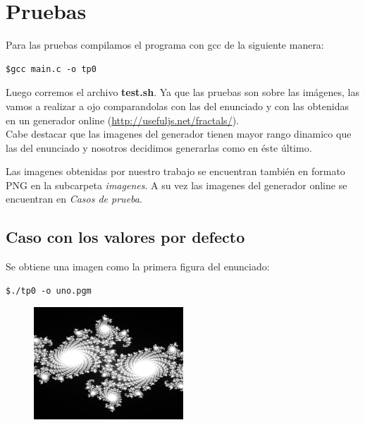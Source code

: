 \documentclass[a4paper,10pt]{article}
\begin{document}


\newpage

\section{Pruebas}

Para las pruebas compilamos el programa con gcc de la siguiente manera:

\begin{lstlisting}[frame=single]
$gcc main.c -o tp0
\end{lstlisting}
Luego corremos el archivo \textbf{test.sh}.
Ya que las pruebas son sobre las imágenes, las vamos a realizar a ojo comparandolas con las del enunciado y con las obtenidas en un generador online (\url{http://usefuljs.net/fractals/}).\\

Cabe destacar que las imagenes del generador tienen mayor rango dinamico que las del enunciado y nosotros decidimos generarlas como en \'{e}ste \'{u}ltimo.

Las imagenes obtenidas por nuestro trabajo se encuentran tambi\'{e}n en formato PNG en la subcarpeta \textit{imagenes}.
A su vez las imagenes del generador online se encuentran en \textit{Casos de prueba}.

\subsection{Caso con los valores por defecto}
Se obtiene una imagen como la primera figura del enunciado:

\begin{lstlisting}[frame=single]
$./tp0 -o uno.pgm
\end{lstlisting}

\begin{figure}[H]
\begin{center}
\includegraphics[width=0.5\textwidth]{imagenes/uno.png}
\caption{} \label{uno}
\end{center}
\end{figure}
\end{document}
